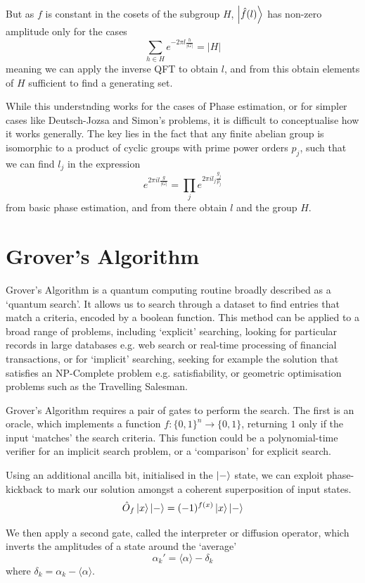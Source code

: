 \documentclass[11pt]{article}
\begin{document}
But as $f$ is constant in the cosets of the subgroup $H$, $\ket{\hat{f}(l)}$ has non-zero amplitude only for the cases
\[\sum_{h\in H}e^{-2\pi l \frac{h}{\vert G\vert}}=\vert H\vert\]
meaning we can apply the inverse QFT to obtain $l$, and from this obtain elements of $H$ sufficient to find a generating set.

While this understnding works for the cases of Phase estimation, or for simpler cases like Deutsch-Jozsa and Simon's problems, it is difficult to conceptualise how it works generally. The key lies in the fact that any finite abelian group is isomorphic to a product of cyclic groups with prime power orders $p_{j}$, such that we can find $l_{j}$ in the expression
\[e^{2\pi i l \frac{g}{\vert G\vert}}=\prod_{j}e^{2\pi i l_{j}\frac{g_{j}}{p_{j}}}\]
from basic phase estimation, and from there obtain $l$ and the group $H$.

\section{Grover's Algorithm}

Grover’s Algorithm is a quantum computing routine broadly described as a `quantum search’. It allows us to search through a dataset to find entries that match a criteria, encoded by a boolean function. This method can be applied to a broad range of problems, including `explicit’ searching, looking for particular records in large databases e.g. web search or real-time processing of financial transactions, or for `implicit’ searching, seeking for example the solution that satisfies an NP-Complete problem e.g. satisfiability, or geometric optimisation problems such as the Travelling Salesman.

Grover's Algorithm requires a pair of gates to perform the search. The first is an oracle, which implements a function $f:\{0,1\}^{n}\rightarrow\{0,1\}$, returning $1$ only if the input `matches' the search criteria. This function could be a polynomial-time verifier for an implicit search problem, or a `comparison' for explicit search.

Using an additional ancilla bit, initialised in the $\ket{-}$ state, we can exploit phase-kickback to mark our solution amongst a coherent superposition of input states.
\begin{equation}
    \hat{O}_{f}\ket{x}\ket{-} = (-1)^{f(x)}\ket{x}\ket{-}
\end{equation}

We then apply a second gate, called the interpreter or diffusion operator, which inverts the amplitudes of a state around the `average'
\[\alpha_{k}' = \langle\alpha\rangle - \delta_{k}\]
where $\delta_{k} = \alpha_{k}-\langle\alpha\rangle$.
\end{document}
